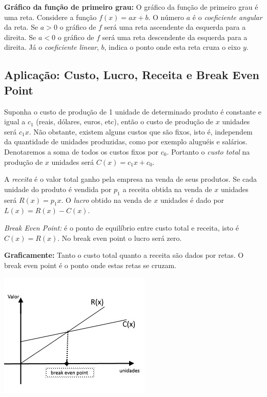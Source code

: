 \noindent\textbf{Gráfico da função de primeiro grau:} O gráfico da função de primeiro grau é
uma reta. Considere a função $f(x)=ax+b$. O número $a$ é o \textit{coeficiente angular} da reta.
Se $a>0$ o gráfico de $f$ será uma reta
ascendente da esquerda para a direita. Se $a<0$ o gráfico de $f$ será uma reta descendente da esquerda para a direita.
Já o \textit{coeficiente linear}, $b$, indica o ponto onde esta reta cruza o eixo $y$.

\subsection{Aplicação: Custo, Lucro, Receita e Break Even Point}

Suponha o custo de produção de 1 unidade de determinado produto é constante e igual a $c_1$ (reais, dólares, euros, etc), então o custo de produção de $x$ unidades será $c_1x$. Não obstante, existem alguns custos que são fixos, isto é, independem
da quantidade de unidades produzidas, como por exemplo aluguéis e salários. Denotaremos a soma de todos os custos fixos por $c_0$. Portanto o \textit{custo total} na produção de $x$ unidades
será  $C(x)=c_1x+c_0.$


A \textit{receita} é o valor total ganho pela empresa na venda de seus produtos. Se cada unidade do produto é vendida por $p_1$
a receita obtida na venda de $x$ unidades será $R(x)=p_1x$. O \textit{lucro} obtido na venda de $x$ unidades é dado por $L(x)=R(x)-C(x)$.

\noindent\textit{Break Even Point:} é o ponto de equilíbrio entre custo total e receita, isto é $C(x)=R(x)$. No break even point o lucro será zero.


\noindent\textbf{Graficamente:} Tanto o custo total quanto a receita são dados por retas. O break even point é o ponto onde estas retas se cruzam.


\begin{center}
\includegraphics{./chapters/preliminares/imgs/breakeven}
\end{center}


